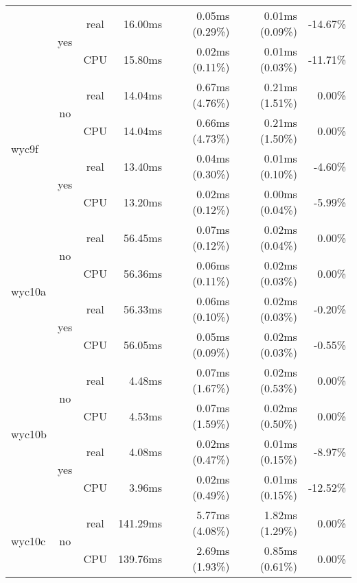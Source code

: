 \documentclass[en]{pracamgr}
\begin{document}
\begin{small}
\begin{longtable}{|l|c|c|r|r|r|r|}
                          \cline{2-7}
                          & \multirow{2}{*}{yes} & real & 16.00ms & 0.05ms (0.29\%) & 0.01ms (0.09\%) & -14.67\% \\*
                          &                      & CPU  & 15.80ms & 0.02ms (0.11\%) & 0.01ms (0.03\%) & -11.71\% \\
\hline
\multirow{4}{*}{wyc9f}    & \multirow{2}{*}{no}  & real & 14.04ms & 0.67ms (4.76\%) & 0.21ms (1.51\%) & 0.00\% \\*
                          &                      & CPU  & 14.04ms & 0.66ms (4.73\%) & 0.21ms (1.50\%) & 0.00\% \\*
                          \cline{2-7}
                          & \multirow{2}{*}{yes} & real & 13.40ms & 0.04ms (0.30\%) & 0.01ms (0.10\%) & -4.60\% \\*
                          &                      & CPU  & 13.20ms & 0.02ms (0.12\%) & 0.00ms (0.04\%) & -5.99\% \\
\hline
\multirow{4}{*}{wyc10a}   & \multirow{2}{*}{no}  & real & 56.45ms & 0.07ms (0.12\%) & 0.02ms (0.04\%) & 0.00\% \\*
                          &                      & CPU  & 56.36ms & 0.06ms (0.11\%) & 0.02ms (0.03\%) & 0.00\% \\*
                          \cline{2-7}
                          & \multirow{2}{*}{yes} & real & 56.33ms & 0.06ms (0.10\%) & 0.02ms (0.03\%) & -0.20\% \\*
                          &                      & CPU  & 56.05ms & 0.05ms (0.09\%) & 0.02ms (0.03\%) & -0.55\% \\
\hline
\multirow{4}{*}{wyc10b}   & \multirow{2}{*}{no}  & real & 4.48ms & 0.07ms (1.67\%) & 0.02ms (0.53\%) & 0.00\% \\*
                          &                      & CPU  & 4.53ms & 0.07ms (1.59\%) & 0.02ms (0.50\%) & 0.00\% \\*
                          \cline{2-7}
                          & \multirow{2}{*}{yes} & real & 4.08ms & 0.02ms (0.47\%) & 0.01ms (0.15\%) & -8.97\% \\*
                          &                      & CPU  & 3.96ms & 0.02ms (0.49\%) & 0.01ms (0.15\%) & -12.52\% \\
\hline
\multirow{4}{*}{wyc10c}   & \multirow{2}{*}{no}  & real & 141.29ms & 5.77ms (4.08\%) & 1.82ms (1.29\%) & 0.00\% \\*
                          &                      & CPU  & 139.76ms & 2.69ms (1.93\%) & 0.85ms (0.61\%) & 0.00\% \\*

\end{longtable}
\end{small}
\end{document}
